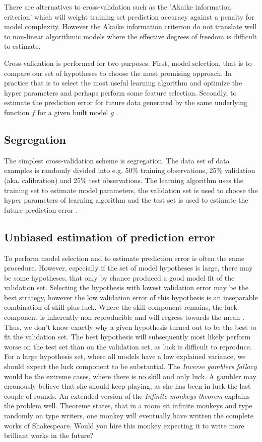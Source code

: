 There are alternatives to cross-validation such as the 'Akaike information criterion' which will weight training set prediction accuracy against a penalty for model complexity. However the Akaike information criterion do not translate well to non-linear algorithmic models where the effective degrees of freedom is difficult to estimate.

Cross-validation is performed for two purposes. First, model selection, that is to compare our set of hypotheses to choose the most promising approach. In practice that is to select the most useful learning algorithm and optimize the hyper parameters and perhaps perform some feature selection. Secondly, to estimate the prediction error for future data generated by the same underlying function $f$ for a given built model $g$ \cite{friedman2001elements}.

\subsection{Segregation}
The simplest cross-validation scheme is segregation. The data set of data examples is randomly divided into e.g. 50\% training observations, 25\% validation (aka. calibration) and 25\% test observations. The learning algorithm uses the training set to estimate model parameters, the validation set is used to choose the hyper parameters of learning algorithm and the test set is used to estimate the future prediction error \cite{friedman2001elements}.

\subsection{Unbiased estimation of prediction error}
\label{unbiased_estimation}
To perform model selection and to estimate prediction error is often the same procedure. However, especially if the set of model hypotheses is large, there may be some hypotheses, that only by chance produced a good model fit of the validation set. Selecting the hypothesis with lowest validation error may be the best strategy, however the low validation error of this hypothesis is an inseparable combination of skill plus luck. Where the skill component remains, the luck component is inherently non reproducible and will regress towards the mean \cite{kahneman2011thinking}. Thus, we don't know exactly why a given hypothesis turned out to be the best to fit the validation set. The best hypothesis will subsequently most likely perform worse on the test set than on the validation set, as luck is difficult to reproduce. For a large hypothesis set, where all models have a low explained variance, we should expect the luck component to be substantial. The \textit{Inverse gamblers fallacy} would be the extreme cases, where there is no skill and only luck. A gambler may erronously believe that she should keep playing, as she has been in luck the last couple of rounds. An extended version of the \textit{Infinite monkeys theorem} explains the problem well. Theoreme states, that in a room sit infinite monkeys and type randomly on type writers, one monkey will eventually  have written the complete works of Shakespeare. Would you hire this monkey expecting it to write more brilliant works in the future? \cite{wiki:gamblers,monkeys}

